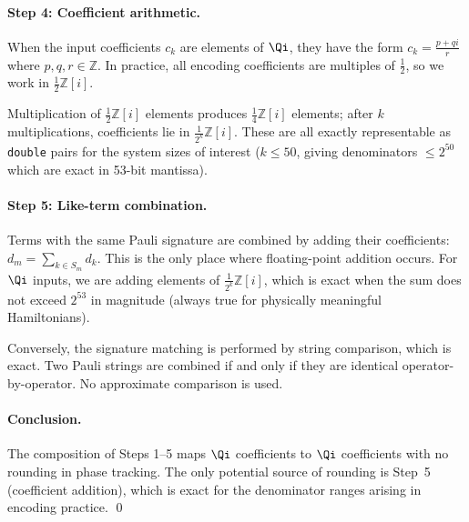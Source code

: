 \paragraph{Step 4: Coefficient arithmetic.}
When the input coefficients $c_k$ are elements of $\Qi$, they have
the form $c_k = \frac{p + qi}{r}$ where $p, q, r \in \mathbb{Z}$.
In practice, all encoding coefficients are multiples of
$\frac{1}{2}$, so we work in $\frac{1}{2}\mathbb{Z}[i]$.

Multiplication of $\frac{1}{2}\mathbb{Z}[i]$ elements produces
$\frac{1}{4}\mathbb{Z}[i]$ elements; after $k$ multiplications,
coefficients lie in $\frac{1}{2^k}\mathbb{Z}[i]$.  These are all
exactly representable as \texttt{double} pairs for the system sizes
of interest ($k \le 50$, giving denominators $\le 2^{50}$ which are
exact in 53-bit mantissa).

\paragraph{Step 5: Like-term combination.}
Terms with the same Pauli signature are combined by adding their
coefficients: $d_m = \sum_{k \in S_m} d_k$.  This is the only
place where floating-point addition occurs.  For $\Qi$ inputs,
we are adding elements of $\frac{1}{2^k}\mathbb{Z}[i]$, which is
exact when the sum does not exceed $2^{53}$ in magnitude (always
true for physically meaningful Hamiltonians).

Conversely, the signature matching is performed by string comparison,
which is exact.  Two Pauli strings are combined if and only if they
are identical operator-by-operator.  No approximate comparison is
used.

\paragraph{Conclusion.}
The composition of Steps 1--5 maps $\Qi$ coefficients to $\Qi$
coefficients with no rounding in phase tracking.  The only potential
source of rounding is Step~5 (coefficient addition), which is exact
for the denominator ranges arising in encoding practice.
\qed
